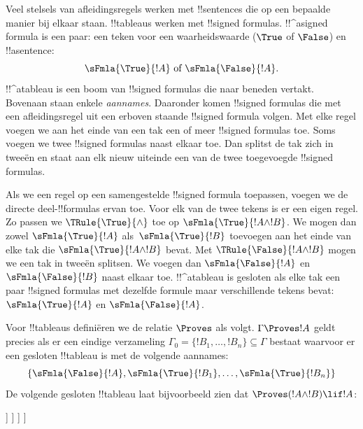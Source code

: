 \documentclass[../../../include/open-logic-section]{subfiles}
\begin{document}
      {}
      {}


Veel stelsels van afleidingsregels werken met !!{sentence}s die op een
bepaalde manier bij elkaar staan. !!{tableau}s werken met
!!{signed formula}s. !!^a{signed formula} is een paar: een teken voor
een waarheidswaarde ($\True$ of $\False$) en !!a{sentence}:
\[
\sFmla{\True}{!A} \text{ of } \sFmla{\False}{!A}.
\]
!!^a{tableau} is een boom van !!{signed formula}s die naar beneden
vertakt. Bovenaan staan enkele \emph{aannames}. Daaronder komen
!!{signed formula}s die met een afleidingsregel uit een erboven staande
!!{signed formula} volgen. Met elke regel voegen we aan het einde van
een tak een of meer !!{signed formula}s toe. Soms voegen we twee
!!{signed formula}s naast elkaar toe. Dan splitst de tak zich in
tweeën en staat aan elk nieuw uiteinde een van de twee toegevoegde
!!{signed formula}s.

Als we een regel op een samengestelde !!{signed formula} toepassen,
voegen we de directe deel-!!{formula}s ervan toe. Voor elk van de twee
tekens is er een eigen regel. Zo passen we $\TRule{\True}{\land}$ toe
op $\sFmla{\True}{!A \land !B}$. We mogen dan zowel
$\sFmla{\True}{!A}$ als~$\sFmla{\True}{!B}$ toevoegen aan het einde
van elke tak die $\sFmla{\True}{!A \land !B}$ bevat. Met
$\TRule{\False}{!A \land !B}$ mogen we een tak in tweeën splitsen. We
voegen dan $\sFmla{\False}{!A}$ en $\sFmla{\False}{!B}$ naast elkaar
toe. !!^a{tableau} is gesloten als elke tak een paar !!{signed formula}s
met dezelfde formule maar verschillende tekens bevat:
$\sFmla{\True}{!A}$ en $\sFmla{\False}{!A}$.

Voor !!{tableau}s definiëren we de relatie $\Proves$ als volgt.
$\Gamma \Proves !A$ geldt precies als er een eindige verzameling
$\Gamma_0 = \{!B_1, \dots, !B_n\} \subseteq \Gamma$ bestaat waarvoor
er een gesloten !!{tableau} is met de volgende aannames:
\[
\{\sFmla{\False}{!A}, \sFmla{\True}{!B_1}, \dots, \sFmla{\True}{!B_n}\} 
\]
De volgende gesloten !!{tableau} laat bijvoorbeeld zien dat $\Proves
(!A \land !B) \lif !A$:
\begin{oltableau}
  [\sFmla{\False}{(\formula{A} \land \formula{B}) \lif \formula{A}}, just = \TAss
    [\sFmla{\True}{\formula{A} \land \formula{B}}, just = {\TRule{\False}{\lif}[1]}
      [\sFmla{\False}{\formula{A}}, just = {\TRule{\False}{\lif}[1]}
        [\sFmla{\True}{\formula{A}}, just = {\TRule{\True}{\lif}[2]}
          [\sFmla{\True}{\formula{B}}, just = {\TRule{\True}{\lif}[2]}, close]
        ]
      ]
    ]
  ]
\end{oltableau}
\end{document}
